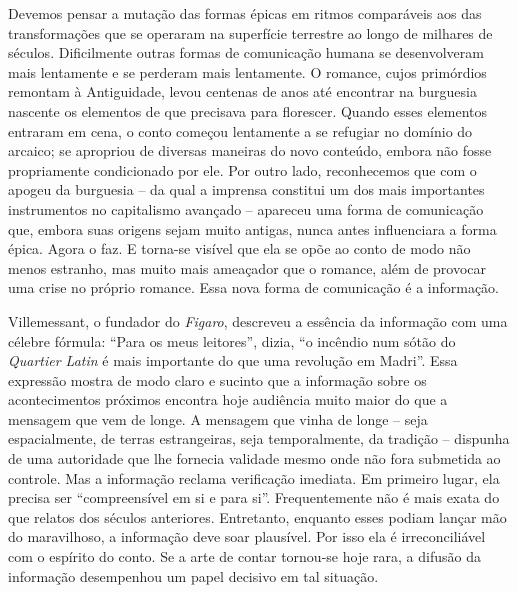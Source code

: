 Devemos pensar a mutação das formas épicas em ritmos comparáveis aos das
transformações que se operaram na superfície terrestre ao longo de
milhares de séculos. Dificilmente outras formas de comunicação humana se
desenvolveram mais lentamente e se perderam mais lentamente. O romance,
cujos primórdios remontam à Antiguidade, levou centenas de anos até
encontrar na burguesia nascente os elementos de que precisava para
florescer. Quando esses elementos entraram em cena, o conto começou
lentamente a se refugiar no domínio do arcaico; se apropriou de diversas
maneiras do novo conteúdo, embora não fosse propriamente condicionado
por ele. Por outro lado, reconhecemos que com o apogeu da burguesia --
da qual a imprensa constitui um dos mais importantes instrumentos no
capitalismo avançado -- apareceu uma forma de comunicação que, embora
suas origens sejam muito antigas, nunca antes influenciara a forma
épica. Agora o faz. E torna-se visível que ela se opõe ao conto de modo
não menos estranho, mas muito mais ameaçador que o romance, além de
provocar uma crise no próprio romance. Essa nova forma de comunicação é
a informação.

Villemessant, o fundador do \emph{Figaro}, descreveu a essência da
informação com uma célebre fórmula: ``Para os meus leitores'', dizia,
``o incêndio num sótão do \emph{Quartier Latin} é mais importante do que
uma revolução em Madri''. Essa expressão mostra de modo claro e sucinto
que a informação sobre os acontecimentos próximos encontra hoje 
audiência muito maior do que a mensagem que vem de longe. A mensagem que
vinha de longe -- seja espacialmente, de terras estrangeiras, seja
temporalmente, da tradição -- dispunha de uma autoridade que lhe
fornecia validade mesmo onde não fora submetida ao controle. Mas a
informação reclama verificação imediata. Em primeiro lugar, ela precisa
ser ``compreensível em si e para si''. Frequentemente não é mais exata
do que relatos dos séculos anteriores. Entretanto, enquanto esses podiam
lançar mão do maravilhoso, a informação deve soar plausível. Por isso
ela é irreconciliável com o espírito do conto. Se a arte de contar
tornou-se hoje rara, a difusão da informação desempenhou um papel
decisivo em tal situação.


